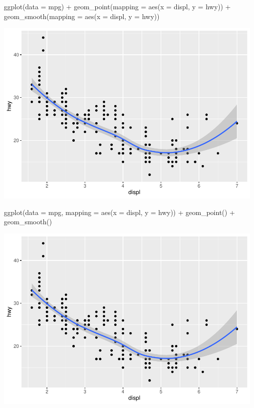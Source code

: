 \documentclass[
]{article}
\newenvironment{Shaded}{\begin{snugshade}}{\end{snugshade}}
\newcommand{\AttributeTok}[1]{\textcolor[rgb]{0.77,0.63,0.00}{#1}}
\newcommand{\FunctionTok}[1]{\textcolor[rgb]{0.00,0.00,0.00}{#1}}
\newcommand{\NormalTok}[1]{#1}
\newcommand{\SpecialCharTok}[1]{\textcolor[rgb]{0.00,0.00,0.00}{#1}}
\begin{document}
\begin{Shaded}
\begin{Highlighting}[]
\FunctionTok{ggplot}\NormalTok{(}\AttributeTok{data =}\NormalTok{ mpg) }\SpecialCharTok{+} 
  \FunctionTok{geom\_point}\NormalTok{(}\AttributeTok{mapping =} \FunctionTok{aes}\NormalTok{(}\AttributeTok{x =}\NormalTok{ displ, }\AttributeTok{y =}\NormalTok{ hwy)) }\SpecialCharTok{+}
  \FunctionTok{geom\_smooth}\NormalTok{(}\AttributeTok{mapping =} \FunctionTok{aes}\NormalTok{(}\AttributeTok{x =}\NormalTok{ displ, }\AttributeTok{y =}\NormalTok{ hwy))}
\end{Highlighting}
\end{Shaded}

\includegraphics{Journal_files/figure-latex/unnamed-chunk-43-1.pdf}

\begin{Shaded}
\begin{Highlighting}[]
\FunctionTok{ggplot}\NormalTok{(}\AttributeTok{data =}\NormalTok{ mpg, }\AttributeTok{mapping =} \FunctionTok{aes}\NormalTok{(}\AttributeTok{x =}\NormalTok{ displ, }\AttributeTok{y =}\NormalTok{ hwy)) }\SpecialCharTok{+} 
  \FunctionTok{geom\_point}\NormalTok{() }\SpecialCharTok{+} 
  \FunctionTok{geom\_smooth}\NormalTok{()}
\end{Highlighting}
\end{Shaded}

\includegraphics{Journal_files/figure-latex/unnamed-chunk-43-2.pdf}
\end{document}
